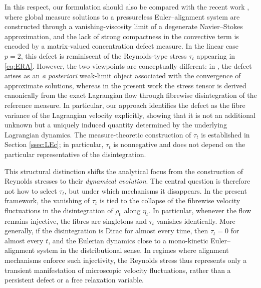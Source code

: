 \documentclass[10pt,reqno]{amsart}
\numberwithin{equation}{section}
\begin{document}
In this respect, our formulation should also be compared with the recent work \cite{WZpre}, where global measure solutions to a pressureless Euler--alignment system are constructed through a vanishing-viscosity limit of a degenerate Navier--Stokes approximation, and the lack of strong compactness in the convective term is encoded by a matrix-valued concentration defect measure. In the linear case $p=2$, this defect is reminiscent of the Reynolds-type stress $\tau_t$ appearing in \eqref{eq:ERA}. However, the two viewpoints are conceptually different: in \cite{WZpre}, the defect arises as an \emph{a posteriori} weak-limit object associated with the convergence of approximate solutions, whereas in the present work the stress tensor is derived canonically from the exact Lagrangian flow through fibrewise disintegration of the reference measure. In particular, our approach identifies the defect as the fibre variance of the Lagrangian velocity explicitly, showing that it is not an additional unknown but a uniquely induced quantity determined by the underlying Lagrangian dynamics. The measure-theoretic construction of $\tau_t$ is established in Section \ref{ssec:LEc}; in particular, $\tau_t$ is nonnegative and does not depend on the particular representative of the disintegration.
 
This structural distinction shifts the analytical focus from the construction of Reynolds stresses to their \emph{dynamical evolution}. The central question is therefore not how to select $\tau_t$, but under which mechanisms it disappears. In the present framework, the vanishing of $\tau_t$ is tied to the collapse of the fibrewise velocity fluctuations in the disintegration of $\rho_0$ along $\eta_t$. In particular, whenever the flow remains injective, the fibres are singletons and $\tau_t$ vanishes identically. More generally, if the
disintegration is Dirac for almost every time, then $\tau_t=0$ for almost every $t$, and the Eulerian dynamics close to a mono-kinetic Euler--alignment system in the distributional sense. In regimes where alignment mechanisms enforce such injectivity, the Reynolds stress thus represents only a transient manifestation of microscopic velocity fluctuations, rather than a persistent defect or a free relaxation variable. 
 
\end{document}
